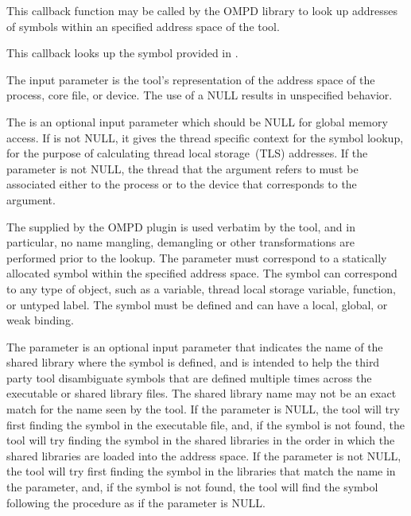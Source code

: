 \descr
This callback function may be called by the OMPD library to look up
addresses of symbols within an specified address space of the tool.

\argdesc
This callback looks up the symbol provided in .

The  input parameter is the tool's representation of the address 
space of the process, core file, or device. The use of a NULL 
results in unspecified behavior.

The  is an optional input parameter which should be NULL for global memory 
access. If   is not NULL, it gives the thread specific context for the symbol 
lookup, for the purpose of calculating thread local storage~(TLS) addresses.
If the  parameter is not NULL, the thread that the  
argument refers to must be associated either to the process or to the device that corresponds to 
the  argument.

The  supplied by the OMPD plugin is used verbatim by the tool, and in particular, 
no name mangling, demangling or other transformations are performed prior to the lookup.
The  parameter must correspond to a statically allocated symbol within the 
specified address space. The symbol can correspond to any type of object, such as a variable, 
thread local storage variable, function, or untyped label. The symbol must be defined and can have 
a local, global, or weak binding.

The  parameter is an optional input parameter that indicates the 
name of the shared library where the symbol is defined, and is intended to help the third party tool 
disambiguate symbols that are defined multiple times across the executable or shared library files. 
The shared library name may not be an exact match for the name seen by the tool. If the 
 parameter is NULL, the tool will try first finding the symbol in the executable file, 
and, if the symbol is not found, the tool will try finding the symbol in the shared libraries in the order 
in which the shared libraries are loaded into the address space. If the  parameter is 
not NULL, the tool will try first finding the symbol in the libraries that match the name in the 
 parameter, and, if the symbol is not found, the tool will find the symbol following
the procedure as if the  parameter is NULL.

